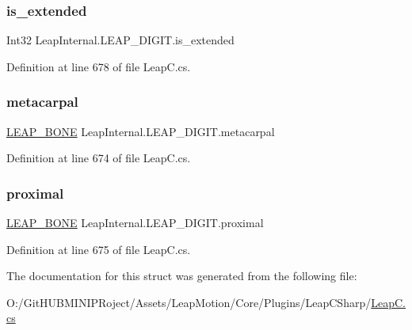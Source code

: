 \subsubsection{\texorpdfstring{is\_extended}{is\_extended}}
{\footnotesize\ttfamily Int32 Leap\+Internal.\+L\+E\+A\+P\+\_\+\+D\+I\+G\+I\+T.\+is\+\_\+extended}



Definition at line 678 of file Leap\+C.\+cs.

\mbox{\label{struct_leap_internal_1_1_l_e_a_p___d_i_g_i_t_aec5b103588165347ef60bcd9093e7dac}} 
\subsubsection{\texorpdfstring{metacarpal}{metacarpal}}
{\footnotesize\ttfamily \mbox{\hyperlink{struct_leap_internal_1_1_l_e_a_p___b_o_n_e}{L\+E\+A\+P\+\_\+\+B\+O\+NE}} Leap\+Internal.\+L\+E\+A\+P\+\_\+\+D\+I\+G\+I\+T.\+metacarpal}



Definition at line 674 of file Leap\+C.\+cs.

\mbox{\label{struct_leap_internal_1_1_l_e_a_p___d_i_g_i_t_a1d0ecc468f05a12d64099428f815aea6}} 
\subsubsection{\texorpdfstring{proximal}{proximal}}
{\footnotesize\ttfamily \mbox{\hyperlink{struct_leap_internal_1_1_l_e_a_p___b_o_n_e}{L\+E\+A\+P\+\_\+\+B\+O\+NE}} Leap\+Internal.\+L\+E\+A\+P\+\_\+\+D\+I\+G\+I\+T.\+proximal}



Definition at line 675 of file Leap\+C.\+cs.



The documentation for this struct was generated from the following file\+:\begin{DoxyCompactItemize}
\item 
O\+:/\+Git\+H\+U\+B\+M\+I\+N\+I\+P\+Roject/\+Assets/\+Leap\+Motion/\+Core/\+Plugins/\+Leap\+C\+Sharp/\mbox{\hyperlink{_leap_c_8cs}{Leap\+C.\+cs}}\end{DoxyCompactItemize}
